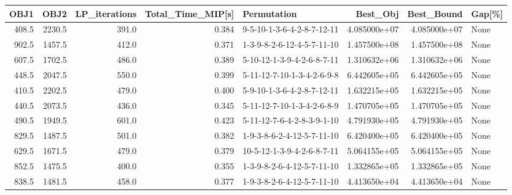 \begin{tabular}{rrrrlrrl}
\toprule
  OBJ1 &    OBJ2 &  LP\_iterations &  Total\_Time\_MIP[s] &                 Permutation &      Best\_Obj &    Best\_Bound & Gap[\%] \\
\midrule
 408.5 &  2230.5 &          391.0 &              0.384 &  9-5-10-1-3-6-4-2-8-7-12-11 &  4.085000e+07 &  4.085000e+07 &   None \\
 902.5 &  1457.5 &          412.0 &              0.371 &  1-3-9-8-2-6-12-4-5-7-11-10 &  1.457500e+08 &  1.457500e+08 &   None \\
 607.5 &  1702.5 &          486.0 &              0.389 &  5-10-12-1-3-9-4-2-6-8-7-11 &  1.310632e+06 &  1.310632e+06 &   None \\
 448.5 &  2047.5 &          550.0 &              0.399 &  5-11-12-7-10-1-3-4-2-6-9-8 &  6.442605e+05 &  6.442605e+05 &   None \\
 410.5 &  2202.5 &          479.0 &              0.400 &  5-9-10-1-3-6-4-2-8-7-12-11 &  1.632215e+05 &  1.632215e+05 &   None \\
 440.5 &  2073.5 &          436.0 &              0.345 &  5-11-12-7-10-1-3-4-2-6-8-9 &  1.470705e+05 &  1.470705e+05 &   None \\
 490.5 &  1949.5 &          601.0 &              0.423 &  5-11-12-7-6-4-2-8-3-9-1-10 &  4.791930e+05 &  4.791930e+05 &   None \\
 829.5 &  1487.5 &          501.0 &              0.382 &  1-9-3-8-6-2-4-12-5-7-11-10 &  6.420400e+05 &  6.420400e+05 &   None \\
 629.5 &  1671.5 &          479.0 &              0.379 &  10-5-12-1-3-9-4-2-6-8-7-11 &  5.064155e+05 &  5.064155e+05 &   None \\
 852.5 &  1475.5 &          400.0 &              0.355 &  1-3-9-8-2-6-4-12-5-7-11-10 &  1.332865e+05 &  1.332865e+05 &   None \\
 838.5 &  1481.5 &          458.0 &              0.377 &  1-9-3-8-2-6-4-12-5-7-11-10 &  4.413650e+04 &  4.413650e+04 &   None \\
\bottomrule
\end{tabular}
